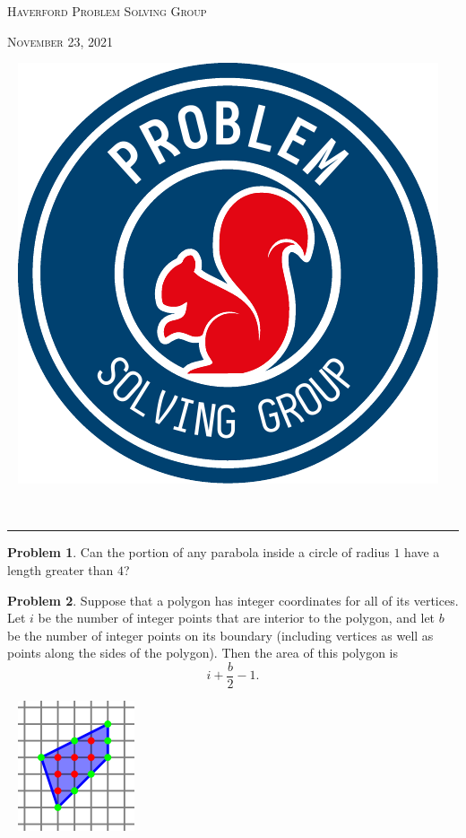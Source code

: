 \documentclass{scrartcl}
\theoremstyle{definition}
\newtheorem{prob}{Problem}
\begin{document}
	\noindent\begin{minipage}{.5\textwidth}{}
		\textsc{Haverford Problem Solving Group}

		\textsc{November 23, 2021}
	\end{minipage}\hfill
	\begin{minipage}{.4\textwidth}{}
		\ \hfill
		\includegraphics[height = .9in]{psg_logo}
	\end{minipage}\\[.5em]
	\hrule

	\setcounter{prob}{5}
	\begin{prob}
		Can the portion of any parabola inside a circle of radius \(1\) have a length greater than \(4\)?
	\end{prob}

	\setcounter{prob}{9}

	\begin{minipage}{.8\textwidth}{}
		\begin{prob}%
			Suppose that a polygon has integer coordinates for all of its vertices. Let \(i\) be the number of integer points that are interior to the polygon, and let \(b\) be the number of integer points on its boundary (including vertices as well as points along the sides of the polygon). Then the area of this polygon is \[
				i + \frac{b}{2} - 1.
			\]
		\end{prob}
	\end{minipage}
	\begin{minipage}{.17\textwidth}{}
		\ \hfill
		\includegraphics[width=.9\textwidth]{pick}
	\end{minipage}
\end{document}
